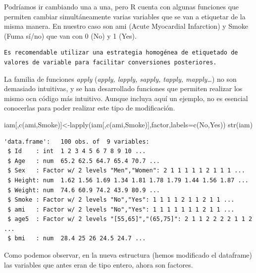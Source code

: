 \documentclass[
  letterpaper,
  DIV=11,
  numbers=noendperiod]{scrreprt}
\newenvironment{Shaded}{\begin{snugshade}}{\end{snugshade}}
\newcommand{\AttributeTok}[1]{\textcolor[rgb]{0.40,0.45,0.13}{#1}}
\newcommand{\FunctionTok}[1]{\textcolor[rgb]{0.28,0.35,0.67}{#1}}
\newcommand{\NormalTok}[1]{\textcolor[rgb]{0.00,0.23,0.31}{#1}}
\newcommand{\OtherTok}[1]{\textcolor[rgb]{0.00,0.23,0.31}{#1}}
\newcommand{\StringTok}[1]{\textcolor[rgb]{0.13,0.47,0.30}{#1}}
\begin{document}
Podríamos ir cambiando una a una, pero R cuenta con algunas funciones
que permiten cambiar simultáneamente varias variables que se van a
etiquetar de la misma manera. En nuestro caso son ami (Acute Myocardial
Infarction) y Smoke (Fuma sí/no) que van con 0 (No) y 1 (Yes).

\begin{verbatim}
Es recomendable utilizar una estrategia homogénea de etiquetado de valores de variable para facilitar conversiones posteriores.
\end{verbatim}

La familia de funciones \emph{apply} (\emph{apply, lapply, sapply,
tapply, mapply\ldots{}}) no son demasiado intuitivas, y se han
desarrollado funciones que permiten realizar los mismo ocn código más
intuitivo. Aunque incluya aquí un ejemplo, no es esencial conocerlas
para poder realizar este tipo de modificación.

\begin{Shaded}
\begin{Highlighting}[]
\NormalTok{iam[,}\FunctionTok{c}\NormalTok{(}\StringTok{\textquotesingle{}ami\textquotesingle{}}\NormalTok{,}\StringTok{\textquotesingle{}Smoke\textquotesingle{}}\NormalTok{)]}\OtherTok{\textless{}{-}}\FunctionTok{lapply}\NormalTok{(iam[,}\FunctionTok{c}\NormalTok{(}\StringTok{\textquotesingle{}ami\textquotesingle{}}\NormalTok{,}\StringTok{\textquotesingle{}Smoke\textquotesingle{}}\NormalTok{)],factor,}\AttributeTok{labels=}\FunctionTok{c}\NormalTok{(}\StringTok{\textquotesingle{}No\textquotesingle{}}\NormalTok{,}\StringTok{\textquotesingle{}Yes\textquotesingle{}}\NormalTok{))}
\FunctionTok{str}\NormalTok{(iam)}
\end{Highlighting}
\end{Shaded}

\begin{verbatim}
'data.frame':   100 obs. of  9 variables:
 $ Id    : int  1 2 3 4 5 6 7 8 9 10 ...
 $ Age   : num  65.2 62.5 64.7 65.4 70.7 ...
 $ Sex   : Factor w/ 2 levels "Men","Women": 2 1 1 1 1 1 2 1 1 1 ...
 $ Height: num  1.62 1.56 1.69 1.34 1.81 1.78 1.79 1.44 1.56 1.87 ...
 $ Weight: num  74.6 60.9 74.2 43.9 80.9 ...
 $ Smoke : Factor w/ 2 levels "No","Yes": 1 1 1 1 2 1 1 2 1 1 ...
 $ ami   : Factor w/ 2 levels "No","Yes": 1 1 1 1 1 1 1 2 1 1 ...
 $ age5  : Factor w/ 2 levels "[55,65]","(65,75]": 2 1 1 2 2 2 2 1 1 2 ...
 $ bmi   : num  28.4 25 26 24.5 24.7 ...
\end{verbatim}

Como podemos observar, en la nueva estructura (hemos modificado el
dataframe) las variables que antes eran de tipo entero, ahora son
factores.
\end{document}
